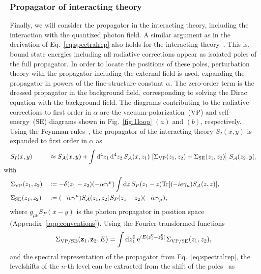 \subsubsection*{Propagator of interacting theory}
Finally, we will consider the propagator in the interacting theory, including the interaction with the quantized photon field. A similar argument as in the derivation of Eq.~\eqref{eq:spectralrep} also holds for the interacting theory~\cite[Section 14.2.]{weinberg2005}. This is, bound state energies including all radiative corrections appear as isolated poles of the full propagator. In order to locate the positions of these poles, perturbation theory with the propagator including the external field is used, expanding the propagator in powers of the fine-structure constant $\alpha$. The zero-order term is the dressed propagator in the background field, corresponding to solving the Dirac equation with the background field. The diagrams contributing to the radiative corrections to first order in $\alpha$ are the vacuum-polarization~(VP) and self-energy~(SE) diagrams shown in Fig.~\ref{fig:1loop} $(a)$ and $(b)$, respectively. Using the Feynman rules~\mbox{\cite[Section 6.1.]{itzykson2005}}, the propagator of the interacting theory $S_{I}(x,y)$ is expanded to first order in $\alpha$ as
\begin{alignat}{2}
&S_{I}(x,y) &&\approx S_{\mathcal{A}}(x,y) + \int \mathrm{d}^4z_1\,\mathrm{d}^4z_2\,
S_{\mathcal{A}}(x,z_1)\,\left[\Sigma_{\text{VP}}(z_1,z_2)+\Sigma_{\text{SE}}(z_1,z_2)\right]\,S_{\mathcal{A}}(z_2,y),\notag\\
&\hspace{-0.35cm}\text{with }&&\notag\\
&\Sigma_{\text{VP}}(z_1,z_2)&&\coloneqq-\delta(z_1-z_2)(-ie\gamma^\mu)\int \text{d}z\,S_P(z_1-z)\Tr [(-ie\gamma_\mu)S_{\mathcal{A}}(z,z)],\notag\\
&\Sigma_{\text{SE}}(z_1,z_2)&&\coloneqq(-ie\gamma^\mu)S_{\mathcal{A}}(z_1,z_2)S_P(z_1-z_2)(-ie\gamma_\mu),
\end{alignat}
where $g_{\mu\nu}S_P(x-y)$ is the photon propagator in position space (Appendix~\ref{app:conventions}). Using the Fourier transformed functions
\begin{equation}
\Sigma_{\text{VP/SE}}(\mathbf{z}_1,\mathbf{z}_2,E)= \int \text{d}z_1^0\, \text{e}^{iE(z_1^0-z_2^0)}\Sigma_{\text{VP/SE}}(z_1,z_2),
\end{equation}
and the spectral representation of the propagator from Eq.~\eqref{eq:spectralrep}, the levelshifts of the $n$-th level can be extracted from the shift of the poles~\mbox{\cite[Section 14.2.]{weinberg2005}} as
